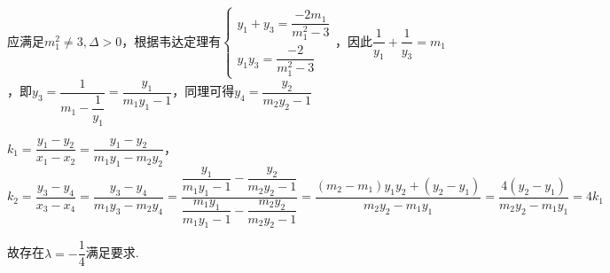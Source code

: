 \begin{enumerate}
\begin{enumerate}
\begin{jieda}
\begin{enumerate}
            应满足$m_1^2 \neq 3, \Delta > 0$，根据韦达定理有$\left\{\begin{array}{l}
                y_1+y_3 = \dfrac{-2m_1}{m_1^2-3} \\
                y_1y_3 = \dfrac{-2}{m_1^2-3}
            \end{array}\right.$，因此$\dfrac{1}{y_1} + \dfrac{1}{y_3} = m_1$，即$y_3 = \dfrac{1}{m_1-\dfrac{1}{y_1}} = \dfrac{y_1}{m_1y_1-1}$，同理可得$y_4 = \dfrac{y_2}{m_2y_2-1}$

            $k_1 = \dfrac{y_1-y_2}{x_1-x_2} = \dfrac{y_1-y_2}{m_1y_1-m_2y_2}$，$k_2 = \dfrac{y_3-y_4}{x_3-x_4} = \dfrac{y_3-y_4}{m_1y_3-m_2y_4} = \dfrac{\dfrac{y_1}{m_1y_1-1}-\dfrac{y_2}{m_2y_2-1}}{\dfrac{m_1y_1}{m_1y_1-1}-\dfrac{m_2y_2}{m_2y_2-1}} = \dfrac{(m_2-m_1)y_1y_2+(y_2-y_1)}{m_2y_2-m_1y_1} = \dfrac{4(y_2-y_1)}{m_2y_2-m_1y_1} = 4k_1$

            故存在$\lambda = -\dfrac{1}{4}$满足要求.
        \end{enumerate}
    \end{jieda}
    \end{enumerate}

\end{enumerate}
